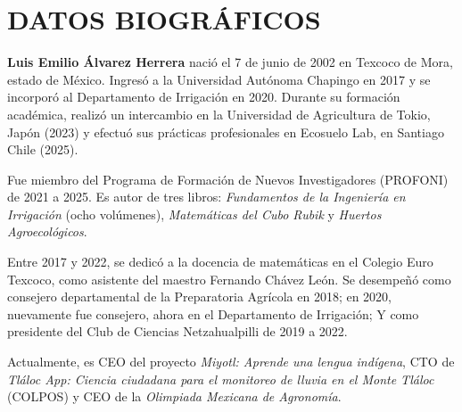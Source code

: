 

\chapter*{DATOS BIOGRÁFICOS}

\textbf{Luis Emilio Álvarez Herrera} nació el 7 de junio de 2002 en Texcoco de Mora, estado de México. Ingresó a la Universidad Autónoma Chapingo en 2017 y se incorporó al Departamento de Irrigación en 2020. Durante su formación académica, realizó un intercambio en la Universidad de Agricultura de Tokio, Japón (2023) y efectuó sus prácticas profesionales en Ecosuelo Lab, en Santiago Chile (2025).

Fue miembro del Programa de Formación de Nuevos Investigadores (PROFONI) de 2021 a 2025. Es autor de tres libros: \textit{Fundamentos de la Ingeniería en Irrigación} (ocho volúmenes), \textit{Matemáticas del Cubo Rubik} y \textit{Huertos Agroecológicos}.

Entre 2017 y 2022, se dedicó a la docencia de matemáticas en el Colegio Euro Texcoco, como asistente del maestro Fernando Chávez León. Se desempeñó como consejero departamental de la Preparatoria Agrícola en 2018; en 2020, nuevamente fue consejero, ahora en el Departamento de Irrigación; Y como presidente del Club de Ciencias Netzahualpilli de 2019 a 2022. 

Actualmente, es CEO del proyecto \textit{Miyotl: Aprende una lengua indígena}, CTO de \textit{Tláloc App: Ciencia ciudadana para el monitoreo de lluvia en el Monte Tláloc} (COLPOS) y CEO de la \textit{Olimpiada Mexicana de Agronomía}.



